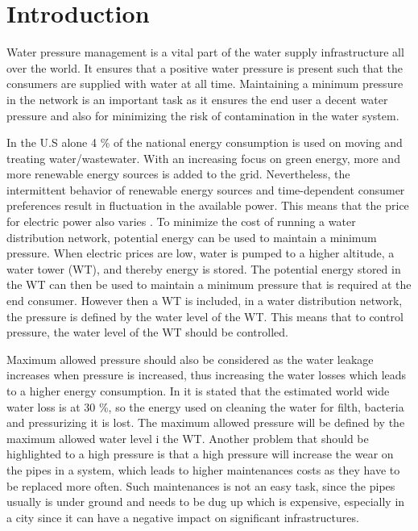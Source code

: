\chapter{Introduction}
\label{introduction}

Water pressure management is a vital part of the water supply infrastructure all over the world. It ensures that a positive water pressure is present such that the consumers are supplied with water at all time. Maintaining a minimum pressure in the network is an important task as it ensures the end user a decent water pressure and also for minimizing the risk of contamination in the water system\cite{national2005public}.

In the U.S alone 4 \% of the national energy consumption is used on moving and treating water/wastewater\cite{appelbaum2002water}. %
%
%
With an increasing focus on green energy, more and more renewable energy sources is added to the grid. Nevertheless, the intermittent behavior of renewable energy sources and time-dependent consumer preferences result in fluctuation in the available power.
This means that the price for electric power also varies \cite{fluctuating_price}. To minimize the cost of running a water distribution network, potential energy can be used to maintain a minimum pressure. When electric prices are low, water is pumped to a higher altitude, a water tower (WT), and thereby energy is stored. The potential energy stored in the WT can then be used to maintain a minimum pressure that is required at the end consumer. However then a WT is included, in a water distribution network, the pressure is defined by the water level of the WT. This means that to control pressure, the water level of the WT should be controlled.  


Maximum allowed pressure should also be considered as the water leakage increases when pressure is increased\cite{feldman2009aspects}, thus increasing the water losses which leads to a higher energy consumption. In \cite{feldman2009aspects} it is stated that the estimated world wide water loss is at 30 \%, so the energy used on cleaning the water for filth, bacteria and pressurizing it is lost. The maximum allowed pressure will be defined by the maximum allowed water level i the WT. Another problem that should be highlighted to a high pressure is that a high pressure will increase the wear on the pipes in a system\cite{Watts_water}, which leads to higher maintenances costs as they have to be replaced more often. Such maintenances is not an easy task, since the pipes usually is under ground and needs to be dug up which is expensive, especially in a city since it can have a negative impact on significant infrastructures. 

